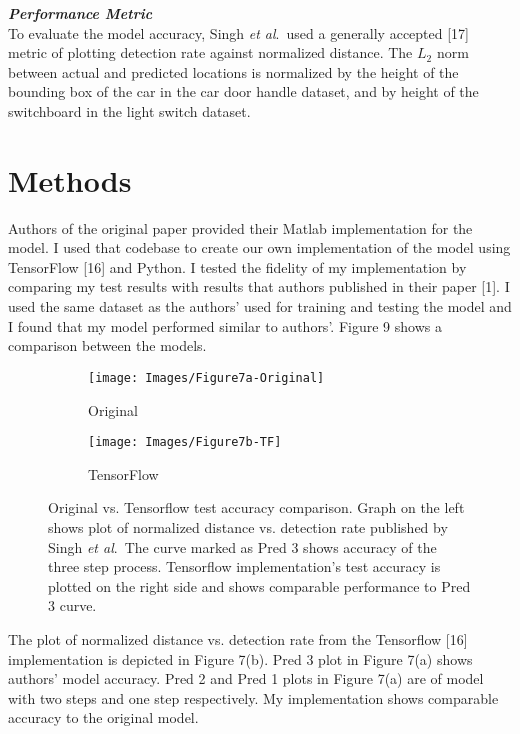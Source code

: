 \documentclass [11pt,letterpaper ,twoside ,openany ]{report}
\begin{document}
    \noindent
    \textbf{\textit{Performance Metric}}\\
    To evaluate the model accuracy, Singh \textit{et al}.\ used a generally accepted [17] metric of plotting detection rate against normalized distance. The \(L_2\) norm between actual and predicted locations is normalized by the height of the bounding box of the car in the car door handle dataset,  and  by height of the switchboard in the light switch dataset.\\

    \chapter{Methods}
    \doublespacing
    Authors of the original paper provided their Matlab implementation for the model. I used that codebase to create our own implementation of the model using TensorFlow [16] and Python. I tested the fidelity of my implementation by comparing my test results with results that authors published in their paper [1]. I used the same dataset as the authors' used for training and testing the model and I found that my model performed similar to authors'. Figure 9 shows a comparison between the models. \\

    \begin{figure}[h!]
    \centering
        \begin{subfigure}[b]{0.49\linewidth}
            \texttt{[image: Images/Figure7a-Original]}
            \caption{Original}
        \end{subfigure}
        \begin{subfigure}[b]{0.49\linewidth}
            \texttt{[image: Images/Figure7b-TF]}
            \caption{TensorFlow}
        \end{subfigure}
        \caption{Original vs. Tensorflow test accuracy comparison. Graph on the left shows plot of normalized distance vs. detection rate published by Singh \textit{et al}.\ The curve marked as Pred 3 shows accuracy of the three step process. Tensorflow implementation's test accuracy is plotted on the right side and shows comparable performance to Pred 3 curve.}
        \label{fig:compare}
    \end{figure}

    The plot of normalized distance vs. detection rate from the Tensorflow [16] implementation is depicted in Figure 7(b). Pred 3 plot in Figure 7(a) shows authors' model accuracy. Pred 2 and Pred 1 plots in Figure 7(a) are of model with two steps and one step respectively. My implementation shows comparable accuracy to the original model.\\
\end{document}
